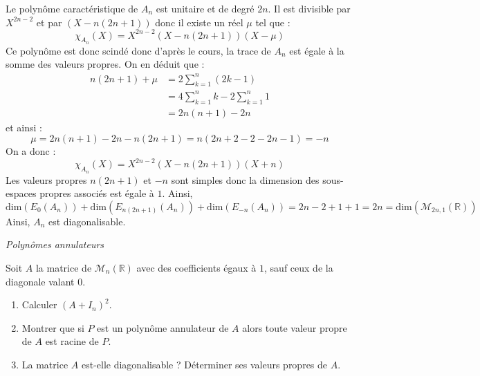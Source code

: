 \documentclass[a4paper,10pt]{report}
\begin{document}
\begin{enumerate}
\noindent Le polynôme caractéristique de $A_n$ est unitaire et de degré $2n$. Il est divisible par $X^{2n-2}$ et par $(X- n(2n+1))$ donc il existe un réel $\mu$ tel que :
$$ \chi_{A_n}(X) = X^{2n-2} (X- n(2n+1)) (X- \mu)$$
Ce polynôme est donc scindé donc d'après le cours, la trace de $A_n$ est égale à la somme des valeurs propres. On en déduit que :
\begin{align*}
 n(2n+1) + \mu & = 2 \sum_{k=1}^n (2k-1) \\
 & = 4 \sum_{k=1}^n k - 2 \sum_{k=1}^n 1 \\
 & = 2n(n+1) -2n 
 \end{align*}
 et ainsi :
 $$ \mu = 2n(n+1)-2n-n(2n+1) = n(2n+2-2-2n-1) = -n$$
 On a donc :
 $$  \chi_{A_n}(X) = X^{2n-2} (X- n(2n+1)) (X+n)$$
 Les valeurs propres $n(2n+1)$ et $-n$ sont simples donc la dimension des sous-espaces propres associés est égale à $1$. Ainsi,
 $$ \textrm{dim}(E_0(A_n))+ \textrm{dim}(E_{n(2n+1)}(A_n))+ \textrm{dim}(E_{-n}(A_n)) = 2n-2+1+1=2n = \textrm{dim}(\mathcal{M}_{2n,1}(\mathbb{R}))$$
Ainsi, $A_n$ est diagonalisable.
\end{enumerate}

\medskip

\begin{center}
\textit{{ {\large Polynômes annulateurs}}}
\end{center}

\medskip

\begin{Exercice}{} Soit $A$ la matrice de $\mathcal{M}_n(\mathbb{R})$ avec des coefficients égaux à $1$, sauf ceux de la diagonale valant $0$.

\begin{enumerate}
\item Calculer $(A+I_n)^2$.
\item Montrer que si $P$ est un polynôme annulateur de $A$ alors toute valeur propre de $A$ est racine de $P$.
\item La matrice $A$ est-elle diagonalisable ? Déterminer ses valeurs propres de $A$. 
\end{enumerate}
\end{Exercice}
\end{document}
